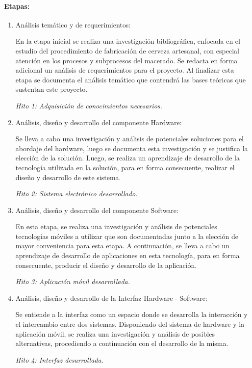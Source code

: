     \paragraph{Etapas:}
        \begin{enumerate}
            \item Análisis temático y de requerimientos:
                \par En la etapa inicial se realiza una investigación bibliográfica, enfocada en el estudio del procedimiento de fabricación de cerveza artesanal, con especial atención en los procesos y subprocesos del macerado. Se redacta en forma adicional un análisis de requerimientos para el proyecto. Al finalizar esta etapa se documenta el análisis temático que contendrá las bases teóricas que sustentan este proyecto.
                \par \textit{Hito 1: Adquisición de conocimientos necesarios.}
                
            \item Análisis, diseño y desarrollo del componente Hardware:
                \par Se lleva a cabo una investigación y análisis de potenciales soluciones para el abordaje del hardware, luego se  documenta esta investigación y se justifica la elección de la solución. Luego, se realiza un aprendizaje de desarrollo de la tecnología utilizada en la solución, para en forma consecuente, realizar el diseño y desarrollo de este sistema.
                \par \textit{Hito 2: Sistema electrónico desarrollado.} 
                
            \item Análisis, diseño y desarrollo del componente Software:
                \par En esta etapa, se realiza una investigación y análisis de potenciales tecnologías móviles a utilizar que son documentadas junto a la elección de mayor conveniencia para esta etapa. A continuación, se lleva a cabo un aprendizaje de desarrollo de aplicaciones en esta tecnología, para en forma consecuente, producir el diseño y desarrollo de la aplicación.
                \par \textit{Hito 3: Aplicación móvil desarrollada.}
                
            \item Análisis, diseño y desarrollo de la Interfaz Hardware - Software:
                \par Se entiende a la interfaz como un espacio donde se desarrolla la interacción y el intercambio entre dos sistemas. Disponiendo del sistema de hardware y la aplicación móvil, se realiza una investigación y análisis de posibles alternativas, procediendo a continuación con el desarrollo de la misma.
                \par \textit{Hito 4: Interfaz desarrollada.}
                

\end{enumerate}
